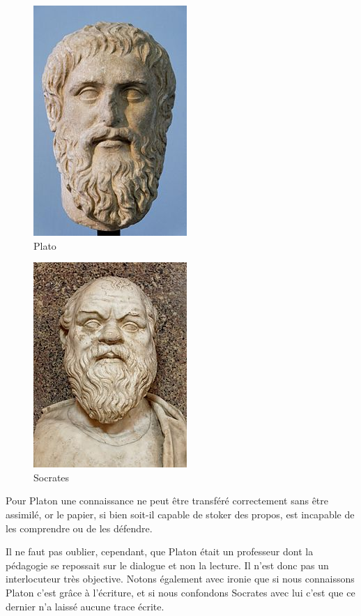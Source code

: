 \begin{minipage}[H]{0.49\linewidth}
  \begin{figure}[H]
  \centering
  \includegraphics[height=0.15\paperheight]{../resources/illustrations/plato2}
  \caption{Plato}
  \end{figure}
\end{minipage}
\begin{minipage}[H]{0.49\linewidth}
  \begin{figure}[H]
  \centering
  \includegraphics[height=0.15\paperheight]{../resources/illustrations/socrates}
  \caption{Socrates}
  \end{figure}
\end{minipage}

Pour Platon une connaissance ne peut être transféré correctement sans être assimilé, or le papier, si bien soit-il capable de stoker des propos, est incapable de les comprendre ou de les défendre.

Il ne faut pas oublier, cependant, que Platon était un professeur dont la pédagogie se repossait sur le dialogue et non la lecture. Il n'est donc pas un interlocuteur très objective. Notons également avec ironie que si nous connaissons Platon c'est grâce à l'écriture, et si nous confondons Socrates avec lui c'est que ce dernier n'a laissé aucune trace écrite.


